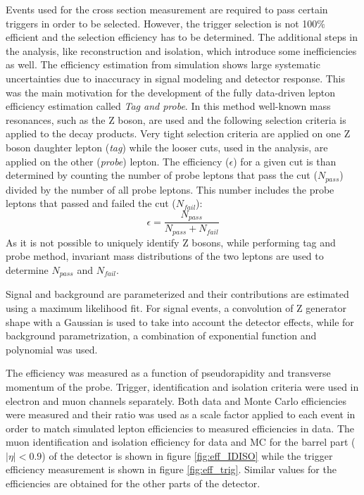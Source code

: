 Events used for the cross section measurement are required to pass certain triggers in order to be selected. However, the trigger selection is not 100$\%$ efficient and the selection efficiency has to be determined. The additional steps in the analysis, like reconstruction and isolation, which introduce some inefficiencies as well. The efficiency estimation from simulation shows large systematic uncertainties due to inaccuracy in signal modeling and detector response. This was the main motivation for the development of the fully data-driven lepton efficiency estimation called \textit{Tag and probe}. In this method well-known mass resonances, such as the Z boson, are used and the following selection criteria is applied to the decay products. 
Very tight selection criteria are applied on one Z boson daughter lepton (\textit{tag}) while the looser cuts, used in the analysis, are applied on the other (\textit{probe}) lepton. The efficiency ($\epsilon$) for a given cut is than determined by counting the number of probe leptons that pass the cut ($N_{pass}$) divided by the number of  all probe leptons. This number includes the probe leptons that passed and failed the cut ($N_{fail}$):    
\begin{equation}
\epsilon = \frac{N_{pass}}{N_{pass}+N_{fail}}
\end{equation} 
As it is not possible to uniquely identify Z bosons, while performing tag and probe method, invariant mass distributions of the two leptons are used to determine $N_{pass}$ and $N_{fail}$. 
  
Signal and background are parameterized and their contributions are estimated using a maximum likelihood fit. For signal events, a convolution of Z generator shape with a Gaussian is used to take into account the detector effects, while for background parametrization, a combination of exponential function and polynomial was used.
\par The efficiency was measured as a function of pseudorapidity and transverse momentum of the probe. Trigger, identification and isolation criteria were used in electron and muon channels separately. Both data and Monte Carlo efficiencies were measured and their ratio was used as a scale factor applied to each event in order to match simulated lepton efficiencies to measured efficiencies in data. The muon identification and isolation efficiency for data and MC for the barrel part ($|\eta|<0.9$) of the detector is shown in figure \ref{fig:eff_IDISO} while the trigger efficiency measurement is shown in figure \ref{fig:eff_trig}. Similar values for the efficiencies are obtained for the other parts of the detector.

